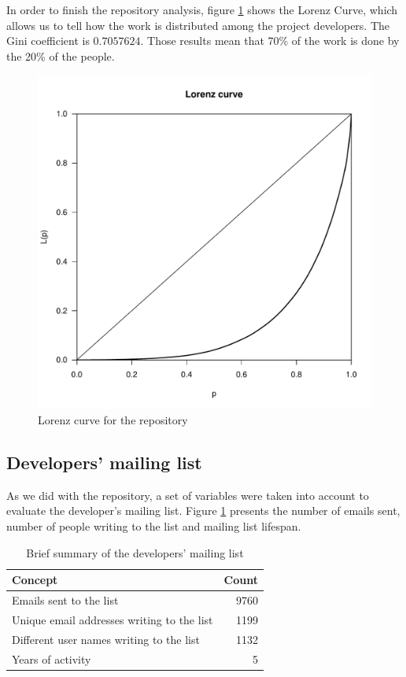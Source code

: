 In order to finish the repository analysis, figure \ref{commits:lorenz} shows the Lorenz Curve, which allows us to tell how the work is distributed among the project developers. The Gini coefficient is $0.7057624$. Those results mean that 70\% of the work is done by the 20\% of the people.

\begin{figure}[!hptb]
\includegraphics[width=400pt]{images/lorenz.pdf}
\caption{Lorenz curve for the repository}
\label{commits:lorenz}
\end{figure}

\subsection{Developers' mailing list}

As we did with the repository, a set of variables were taken into account to evaluate the developer's mailing list. Figure \ref{dev_mls:summary} presents the number of emails sent, number of people writing to the list and mailing list lifespan. 

\begin{table}[ht]
\begin{center}
\begin{tabular}{lr}
  \hline
Concept & Count \\ 
  \hline
Emails sent to the list & 9760 \\ 
Unique email addresses writing to the list & 1199 \\ 
Different user names writing to the list & 1132 \\
Years of activity & 5\\
   \hline
\end{tabular}
\caption{Brief summary of the developers' mailing list}
\label{dev_mls:summary}
\end{center}
\end{table}

